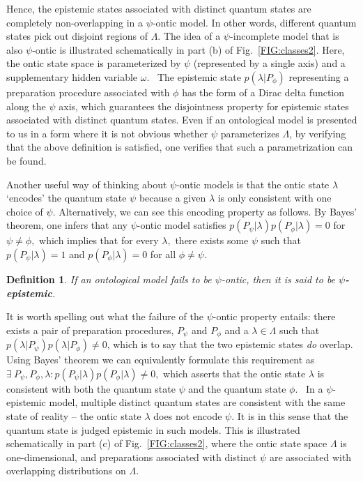 \documentclass[aps,nofootinbib,12pt]{revtex4-2}
\newtheorem{definition}[theorem]{Definition}
\begin{document}
Hence, the epistemic states associated with distinct quantum states
are completely non-overlapping in a $\psi$-ontic model. In other
words, different quantum states pick out disjoint regions of
$\Lambda.$ The idea of a $\psi$-incomplete model that is also
$\psi$-ontic is illustrated schematically in part (b) of
Fig.~\ref{FIG:classes2}. Here, the ontic state space is
parameterized by $\psi$ (represented by a single axis) and a
supplementary hidden variable $\omega.$ \ The epistemic state
$p(\lambda|P_{\phi})$ representing a preparation procedure
associated with $\phi$ has the form of a Dirac delta function along
the $\psi$ axis, which guarantees the disjointness property for
epistemic states associated with distinct quantum states. Even if an
ontological model is presented to us in a form where it is not
obvious whether $\psi$ parameterizes $\Lambda$, by verifying that
the above definition is satisfied, one verifies that such a
parametrization can be found.

Another useful way of thinking about $\psi$-ontic models is that the
ontic state $\lambda$ `encodes' the quantum state $\psi$ because a
given $\lambda$ is only consistent with one choice of $\psi$.
Alternatively, we can see this encoding property as follows. By
Bayes' theorem, one infers that any $\psi$-ontic model satisfies
$p(P_{\psi}|\lambda)p(P_{\phi}|\lambda)=0$ for $\psi\neq\phi,$ which
implies that for every $\lambda,$ there exists some $\psi$ such that
$p(P_{\psi}|\lambda)=1$ and $p(P_{\phi}|\lambda)=0$ for all $\phi
\neq\psi.$

\begin{definition}
If an ontological model fails to be $\psi$-ontic, then it is said to
be \textbf{$\psi$-epistemic}.\label{DEF:psi_epistemic}
\end{definition}


It is worth spelling out what the failure of the $\psi$-ontic
property entails: there exists a pair of preparation procedures,
$P_{\psi}$ and ${P}_{\phi}$ and a $\lambda\in\Lambda$ such that
$p\left( \lambda|P_{\psi }\right) p\left( \lambda|P_{\phi}\right)
\neq{0}$, which is to say that the two epistemic states \emph{do
}overlap. Using Bayes' theorem we can equivalently formulate this
requirement as $\exists\:{P}_{\psi},{P}_{\phi },\lambda:p\left(
P_{\psi}|\lambda\right)  p\left(  P_{\phi}|\lambda\right) \neq{0},$
which asserts that the ontic state $\lambda$ is consistent with both
the quantum state $\psi$ and the quantum state $\phi.$ \ In a
$\psi$-epistemic model, multiple distinct quantum states are
consistent with the same state of reality -- the ontic state
$\lambda$ does not encode $\psi.$ It is in this sense that the
quantum state is judged epistemic in such models. This is
illustrated schematically in part (c) of Fig.~\ref{FIG:classes2},
where the ontic state space $\Lambda$ is one-dimensional, and
preparations associated with distinct $\psi$ are associated with
overlapping distributions on $\Lambda.$
\end{document}
